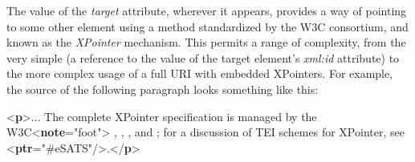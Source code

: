 The value of the {\itshape target} attribute, wherever it appears, provides a way of pointing to some other element using a method standardized by the W3C consortium, and known as the \textit{XPointer} mechanism. This permits a range of complexity, from the very simple (a reference to the value of the target element's {\itshape xml:id} attribute) to the more complex usage of a full URI with embedded XPointers. For example, the source of the following paragraph looks something like this: \par\bgroup{}\exampleFont \begin{shaded}\noindent\mbox{}{<\textbf{p}>}...\mbox{}\newline 
 The complete XPointer specification is managed by the W3C{<\textbf{note}\hspace*{1em}{place}="{foot}">}\mbox{}\newline 
\hspace*{1em},\mbox{}\newline 
{},\mbox{}\newline 
{}, and\mbox{}\newline 
{}\mbox{}\newline 
{};\mbox{}\newline 
 for a discussion of TEI schemes for XPointer, see\mbox{}\newline 
{<\textbf{ptr}\hspace*{1em}{target}="{\#eSATS}"/>}.{</\textbf{p}>}\mbox{}\newline 

\end{shaded}
